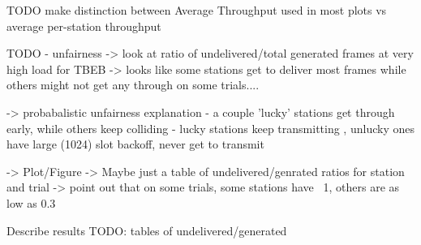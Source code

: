 \documentclass[twocolumn]{article}
\begin{document}
TODO make distinction between Average Throughput used in most plots vs average per-station 
throughput

TODO - unfairness -> look at ratio of undelivered/total generated frames at very high load
                     for TBEB -> looks like some stations get to deliver most frames while others
                     might not get any through on some trials....

                     -> probabalistic unfairness explanation - a couple 'lucky' stations get 
                     through early, while others keep colliding - lucky stations keep transmitting
                     , unlucky ones have large (1024) slot backoff, never get to transmit

     -> Plot/Figure -> Maybe just a table of undelivered/genrated ratios for station and trial
                        -> point out that on some trials, some stations have ~1, others are as 
                        low as 0.3


Describe results TODO: tables of undelivered/generated
\end{document}
